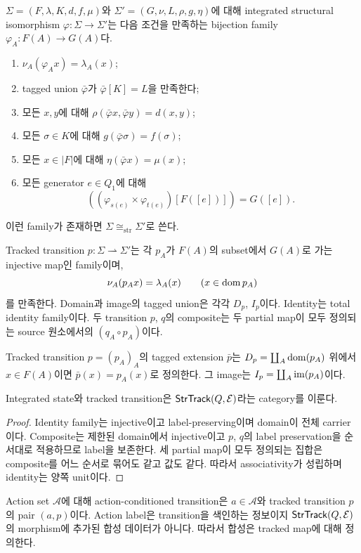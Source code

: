 \begin{definition}
$\Sigma=(F,\lambda,K,d,f,\mu)$와
$\Sigma'=(G,\nu,L,\rho,g,\eta)$에 대해 integrated structural isomorphism
$\varphi:\Sigma\to\Sigma'$는 다음 조건을 만족하는 bijection family
$\varphi_A:F(A)\to G(A)$다.
\begin{enumerate}
\item $\nu_A(\varphi_Ax)=\lambda_A(x)$;
\item tagged union $\bar\varphi$가 $\bar\varphi[K]=L$을 만족한다;
\item 모든 $x,y$에 대해 $\rho(\bar\varphi x,\bar\varphi y)=d(x,y)$;
\item 모든 $\sigma\in K$에 대해 $g(\bar\varphi\sigma)=f(\sigma)$;
\item 모든 $x\in|F|$에 대해 $\eta(\bar\varphi x)=\mu(x)$;
\item 모든 generator $e\in Q_1$에 대해
\[
((\varphi_{s(e)}\times\varphi_{t(e)})[F([e])])=G([e]).
\]
\end{enumerate}
이런 family가 존재하면 $\Sigma\cong_{\mathrm{str}}\Sigma'$로 쓴다.
\end{definition}

\begin{definition}
Tracked transition $p:\Sigma\rightharpoonup\Sigma'$는 각 $p_A$가
$F(A)$의 subset에서 $G(A)$로 가는 injective map인 family이며,
\[
\nu_A(p_Ax)=\lambda_A(x)\qquad(x\in\operatorname{dom} p_A)
\]
를 만족한다. Domain과 image의 tagged union은 각각 $D_p$, $I_p$이다.
Identity는 total identity family이다. 두 transition $p$, $q$의 composite는
두 partial map이 모두 정의되는 source 원소에서의
$(q_A\circ p_A)$이다.
\end{definition}
\begin{definition}
Tracked transition $p=(p_A)_A$의 tagged extension $\bar p$는
$D_p=\coprod_A\operatorname{dom}(p_A)$ 위에서 $x\in F(A)$이면 $\bar p(x)=p_A(x)$로
정의한다. 그 image는 $I_p=\coprod_A\operatorname{im}(p_A)$이다.
\end{definition}


\begin{proposition}
Integrated state와 tracked transition은 $\mathsf{StrTrack}(Q,\mathcal E)$라는 category를
이룬다.
\end{proposition}

\begin{proof}
Identity family는 injective이고 label-preserving이며 domain이 전체 carrier이다.
Composite는 제한된 domain에서 injective이고 $p$, $q$의 label preservation을
순서대로 적용하므로 label을 보존한다. 세 partial map이 모두 정의되는
집합은 composite를 어느 순서로 묶어도 같고 값도 같다. 따라서 associativity가
성립하며 identity는 양쪽 unit이다.
\end{proof}

\begin{definition}
Action set $\mathcal A$에 대해 action-conditioned transition은
$a\in\mathcal A$와 tracked transition $p$의 pair $(a,p)$이다. Action label은
transition을 색인하는 정보이지 $\mathsf{StrTrack}(Q,\mathcal E)$의 morphism에 추가된
합성 데이터가 아니다. 따라서 합성은 tracked map에 대해 정의한다.
\end{definition}
